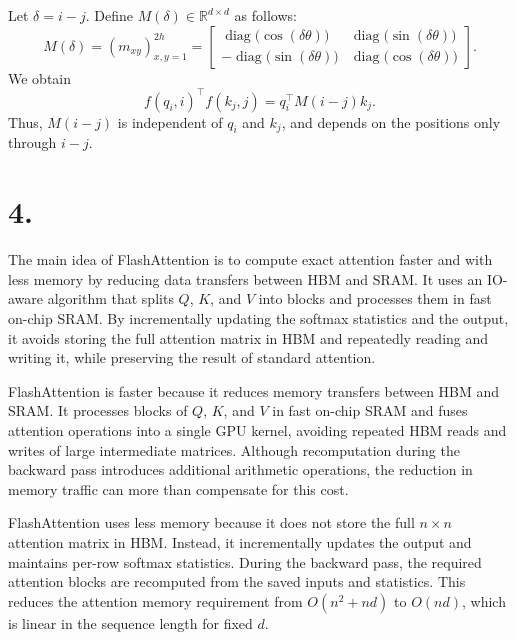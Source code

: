\documentclass[11pt,a4paper]{article}
\DeclareMathOperator{\diag}{diag}
\newcommand{\R}{\mathbb{R}}
\begin{document}
Let \(\delta=i-j\). Define \(M(\delta)\in\R^{d\times d}\) as follows:
\[
M(\delta)=(m_{xy})_{x,y=1}^{2h}=
\begin{bmatrix}
\diag\!\bigl(\cos(\delta\theta)\bigr)
&
\diag\!\bigl(\sin(\delta\theta)\bigr)\\
-\diag\!\bigl(\sin(\delta\theta)\bigr)
&
\diag\!\bigl(\cos(\delta\theta)\bigr)
\end{bmatrix}.
\]
We obtain
\[
f(q_i,i)^\top f(k_j,j)=q_i^\top M(i-j)k_j.
\]
Thus, \(M(i-j)\) is independent of \(q_i\) and \(k_j\), and depends on the
positions only through \(i-j\).
\endgroup

\clearpage
\section*{4.}

The main idea of FlashAttention is to compute
exact attention faster and with less memory by reducing data transfers
between HBM and SRAM. It uses an IO-aware algorithm that splits \(Q\),
\(K\), and \(V\) into blocks and processes them in fast on-chip SRAM.
By incrementally updating the softmax statistics and the output, it
avoids storing the full attention matrix in HBM and repeatedly reading
and writing it, while preserving the result of standard attention.

FlashAttention is faster because it reduces memory transfers between
HBM and SRAM. It processes blocks of \(Q\), \(K\), and \(V\) in fast on-chip SRAM and fuses
attention operations into a single GPU kernel, avoiding repeated HBM
reads and writes of large intermediate matrices. Although recomputation
during the backward pass introduces additional arithmetic operations,
the reduction in memory traffic can more than compensate for this cost.

FlashAttention uses less memory because it does not store the full
\(n\times n\) attention matrix in HBM. Instead, it
incrementally updates the output and maintains per-row softmax
statistics. During the backward pass, the required attention blocks are
recomputed from the saved inputs and statistics. This reduces the attention
memory requirement from \(O(n^2+nd)\) to \(O(nd)\), which is linear in the sequence
length for fixed \(d\).
\end{document}
